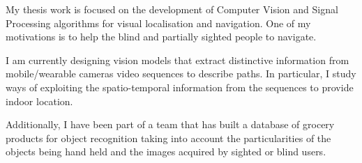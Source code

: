My thesis work is focused on the development of Computer Vision and Signal Processing algorithms for visual localisation and navigation. One of my motivations is to help the blind and partially sighted people to navigate.

I am currently designing vision models that extract distinctive information from mobile/wearable cameras video sequences to describe paths. In particular, I study ways of exploiting the spatio-temporal information from the sequences to provide indoor location. 

Additionally, I have been part of a team that has built a database of grocery products for object recognition taking into account the particularities of the objects being hand held and the images acquired by sighted or blind users.

